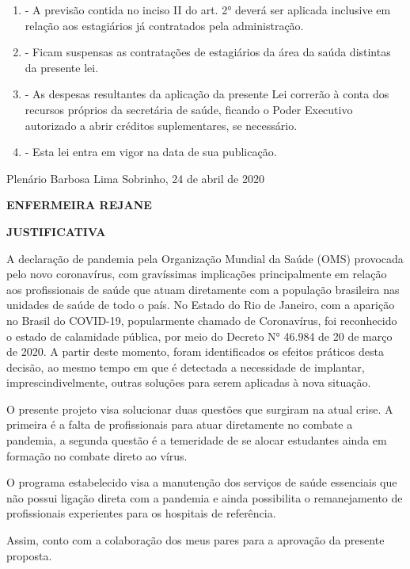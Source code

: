 \documentclass[10pt]{article}
\begin{document}
\begin{enumerate}[label=Art. \arabic*\textdegree]
\item - A previsão contida no inciso II do art. 2° deverá ser aplicada inclusive em relação aos estagiários já contratados pela administração.

\item - Ficam suspensas as contratações de estagiários da área da saúda distintas da presente lei.

\item - As despesas resultantes da aplicação da presente Lei correrão à conta dos recursos próprios da secretária de saúde,  ficando o Poder Executivo autorizado a abrir créditos suplementares, se necessário.

\item - Esta lei entra em vigor na data de sua publicação.


\end{enumerate}




\begin{center}
  Plenário Barbosa Lima Sobrinho, 24 de abril de 2020

   \bigskip

  \textbf{ ENFERMEIRA REJANE}

  \bigskip

  \textbf{JUSTIFICATIVA}
  \bigskip

\end{center}

  A declaração de pandemia pela Organização Mundial da Saúde  (OMS)  provocada  pelo novo   coronavírus, com gravíssimas implicações  principalmente em relação aos  profissionais de saúde que atuam diretamente com a população brasileira nas unidades de saúde de todo o país.
No Estado do Rio de Janeiro, com  a aparição no Brasil do COVID-19, popularmente chamado de Coronavírus, foi reconhecido o estado de   calamidade pública,  por meio do   Decreto   N° 46.984  de  20  de  março  de  2020. A partir deste momento, foram identificados os  efeitos  práticos  desta  decisão,  ao   mesmo   tempo   em  que é  detectada  a  necessidade de implantar, imprescindivelmente, outras soluções  para serem aplicadas à nova situação. 

O presente projeto visa solucionar duas questões que surgiram na atual crise. A primeira é a falta de profissionais para atuar diretamente no combate a pandemia, a segunda questão é a temeridade de se alocar estudantes ainda em formação no combate direto ao vírus.

O programa estabelecido visa a manutenção dos serviços de saúde essenciais que não possui ligação direta com a pandemia e ainda possibilita o remanejamento de profissionais experientes para os hospitais de referência.

Assim, conto com a colaboração dos meus pares para a aprovação da presente proposta.



\iffalse
\begin{center}
  \textbf{REFERÊNCIAS}
\end{center}


\fi
\end{document}
